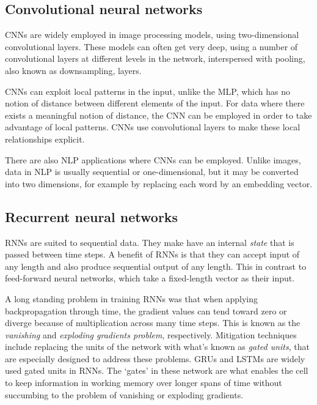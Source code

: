 \subsection{Convolutional neural networks}

\acp{CNN} are widely employed in image processing models, using
two-dimensional convolutional layers. These models can often get very deep,
using a number of convolutional layers at different levels in the network,
interspersed with pooling, also known as downsampling, layers.

\acp{CNN} can exploit local patterns in the input, unlike the \ac{MLP}, which
has no notion of distance between different elements of the input. For data
where there exists a meaningful notion of distance, the \ac{CNN} can be
employed in order to take advantage of local patterns. \acp{CNN} use
convolutional layers to make these local relationships explicit.

There are also \ac{NLP} applications where \acp{CNN} can be employed. Unlike
images, data in \ac{NLP} is usually sequential or one-dimensional, but it may
be converted into two dimensions, for example by replacing each word by an
embedding vector.


\subsection{Recurrent neural networks}
\label{seq:rnn}

\acp{RNN} are suited to sequential data. They make have an internal
\emph{state} that is passed between time steps. A benefit of \acp{RNN} is
that they can accept input of any length and also produce sequential output
of any length. This in contrast to feed-forward neural networks, which take a
fixed-length vector as their input.

A long standing problem in training \acp{RNN} was that when applying
backpropagation through time, the gradient values can tend toward zero or
diverge because of multiplication across many time steps. This is known as
the \emph{vanishing} and \emph{exploding gradients problem}, respectively.
Mitigation techniques include replacing the units of the network with what's
known as \emph{gated units}, that are especially designed to address these
problems. \acp{GRU} and \acp{LSTM} are widely used gated units in RNNs. The
`gates' in these network are what enables the cell to keep information in
working memory over longer spans of time without succumbing to the problem of
vanishing or exploding gradients.


